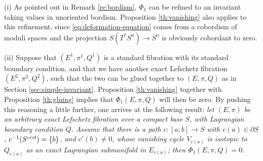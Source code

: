 \documentclass[10pt,letterpaper]{article}
\begin{document}
\begin{remarks} \label{re:vanishing}
(i) As pointed out in Remark \ref{re:bordism}, $\Phi_1$ can be refined to an
invariant taking values in unoriented bordism. Proposition \ref{th:vanishing}
also applies to this refinement, since \eqref{eq:deformation-equation} comes
from a cobordism of moduli spaces and the projection $S(T^*S^n) \rightarrow
S^n$ is obviously cobordant to zero.

(ii) Suppose that $(E^1,\pi^1,Q^1)$ is a standard fibration with its standard
boundary condition, and that we have another exact Lefschetz fibration
$(E^2,\pi^2,Q^2)$, such that the two can be glued together to $(E,\pi,Q)$ as in
Section \ref{sec:simple-invariant}. Proposition \ref{th:vanishing} together
with Proposition \ref{th:gluing} implies that $\Phi_1(E,\pi,Q)$ will then be
zero. By pushing this reasoning a little further, one arrives at the following
result: {\em let $(E,\pi)$ be an arbitrary exact Lefschetz fibration over a
compact base $S$, with Lagrangian boundary condition $Q$. Assume that there is
a path $c: [a;b] \rightarrow S$ with $c(a) \in \partial S$, $c^{-1}(S^{crit}) =
\{b\}$, and $c'(b) \neq 0$, whose vanishing cycle $V_{c(a)}$ is isotopic to
$Q_{c(a)}$ as an exact Lagrangian submanifold in $E_{c(a)}$; then
$\Phi_1(E,\pi,Q) = 0$}.


\end{remarks}
\end{document}
